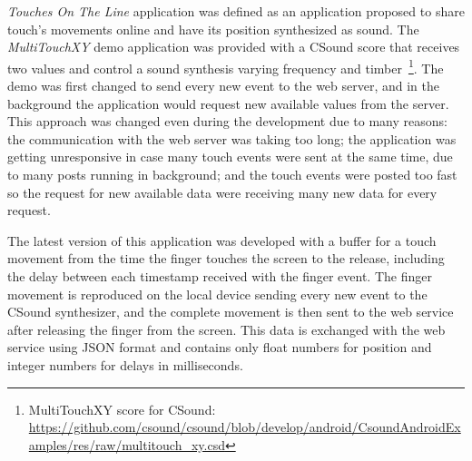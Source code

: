 \textit{Touches On The Line} application was defined as an application proposed to share touch's movements online and have its position synthesized as sound.
The \textit{MultiTouchXY} demo application was provided with a CSound score that receives two values and control a sound synthesis varying frequency and timber~\footnote{MultiTouchXY score for CSound: \url{https://github.com/csound/csound/blob/develop/android/CsoundAndroidExamples/res/raw/multitouch_xy.csd}}.
The demo was first changed to send every new event to the web server, and in the background the application would request new available values from the server.
This approach was changed even during the development due to many reasons: the communication with the web server was taking too long; the application was getting
unresponsive in case many touch events were sent at the same time, due to many posts running in background;
and the touch events were posted too fast so the request for new available data were receiving many new data for every request.


The latest version of this application was developed with a buffer for a touch movement from the time the finger touches the screen to the release, including the delay between each timestamp received with the finger event.
The finger movement is reproduced on the local device sending every new event to the CSound synthesizer, and the complete movement is then sent to the web service after releasing the finger from the screen.
This data is exchanged with the web service using JSON format and contains only float numbers for position and integer numbers for delays in milliseconds.

